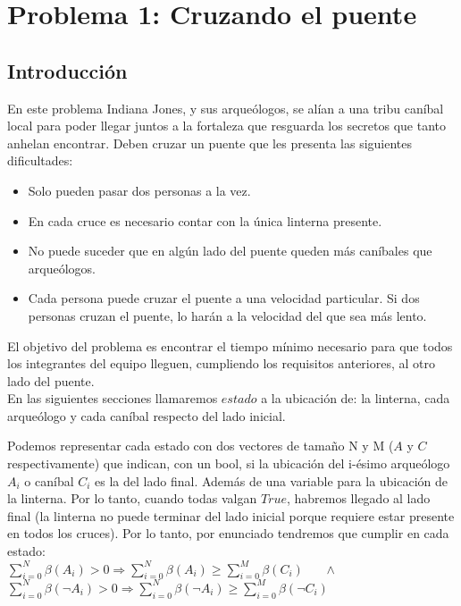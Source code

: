 \section{Problema 1: Cruzando el puente}

\subsection{Introducción}
		En este problema Indiana Jones, y sus arqueólogos, se alían a una tribu caníbal local para poder llegar juntos a la fortaleza que resguarda los secretos que tanto anhelan encontrar. Deben cruzar un puente que les presenta las siguientes dificultades:

			\begin{itemize}
				\item Solo pueden pasar dos personas a la vez.
				\item En cada cruce es necesario contar con la única linterna presente.
				\item No puede suceder que en algún lado del puente queden más caníbales que arqueólogos.
				\item Cada persona puede cruzar el puente a una velocidad particular. Si dos personas cruzan el puente, lo harán a la velocidad del que sea más lento.
			\end{itemize}

		El objetivo del problema es encontrar el tiempo mínimo necesario para que todos los integrantes del equipo lleguen, cumpliendo los requisitos anteriores, al otro lado del puente.
		\\

		En las siguientes secciones llamaremos $estado$ a la ubicación de: la linterna, cada arqueólogo y cada caníbal respecto del lado inicial.

		Podemos representar cada estado con dos vectores de tamaño N y M ($A$ y $C$ respectivamente) que indican, con un bool, si la ubicación del i-ésimo arqueólogo $A_i$ o caníbal $C_i$ es la del lado final. Además de una variable para la ubicación de la linterna. Por lo tanto, cuando todas valgan $True$, habremos llegado al lado final (la linterna no puede terminar del lado inicial porque requiere estar presente en todos los cruces). Por lo tanto, por enunciado tendremos que cumplir en cada estado:
		\\

		$\sum_{i=0}^{N}\beta(A_i) > 0 \Rightarrow \sum_{i=0}^{N}\beta(A_i) \ge \sum_{i=0}^{M}\beta(C_i)  $
		\ \ \
		$\wedge$
		\ \ \
		$\sum_{i=0}^{N}\beta(\neg A_i) > 0 \Rightarrow \sum_{i=0}^{N}\beta(\neg A_i) \ge \sum_{i=0}^{M}\beta(\neg C_i)$
		\\

